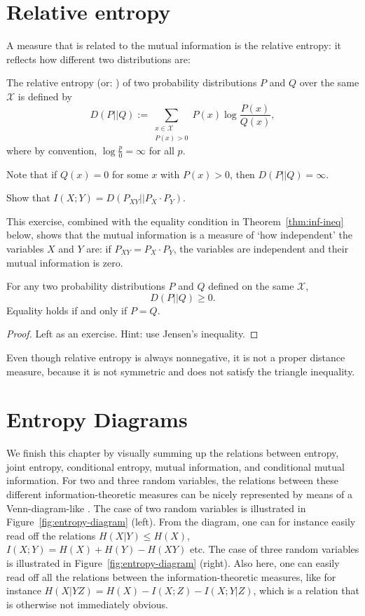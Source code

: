 \section{Relative entropy}
A measure that is related to the mutual information is the relative entropy: it reflects how different two distributions are:
\begin{definition}
The relative entropy (or: \href{https://en.wikipedia.org/wiki/Kullback%E2%80%93Leibler_divergence}{\term{Kullback-Leibler divergence}}) of two probability distributions $P$ and $Q$ over the same $\mathcal{X}$ is defined by
\[
D(P||Q) := \sum_{\substack{x \in \mathcal{X} \\ P(x) > 0}} P(x) \log \frac{P(x)}{Q(x)},
\]
where by convention, $\log\frac{p}{0} = \infty$ for all $p$.
\end{definition}
Note that if $Q(x) = 0$ for some $x$ with $P(x) > 0$, then $D(P||Q) = \infty$.

\begin{exercise}
Show that $I(X;Y) = D(P_{XY} || P_X \cdot P_Y)$. 
\end{exercise}
This exercise, combined with the equality condition in Theorem~\ref{thm:inf-ineq} below, shows that the mutual information is a measure of `how independent' the variables $X$ and $Y$ are: if $P_{XY} = P_X \cdot P_Y$, the variables are independent and their mutual information is zero.

\begin{theorem}\label{thm:inf-ineq}
For any two probability distributions $P$ and $Q$ defined on the same $\mathcal{X}$,
\[
D(P||Q) \geq 0.
\]
Equality holds if and only if $P = Q$.
\end{theorem}
\begin{proof}
Left as an exercise. Hint: use Jensen's inequality.
\end{proof}
Even though relative entropy is always nonnegative, it is not a proper
distance measure, because it is not symmetric and does not satisfy the
triangle inequality. 


\section{Entropy Diagrams}\label{sec:Venn}
We finish this chapter by visually summing up the relations between entropy, joint entropy, conditional entropy, mutual information, and conditional mutual information. For two and three random variables, the relations between these different information-theoretic measures can be nicely represented by means of a Venn-diagram-like . The case of two random variables is illustrated in Figure~\ref{fig:entropy-diagram} (left). From the diagram, one can for instance easily read off the relations $H(X|Y) \leq H(X)$, $I(X;Y) = H(X) + H(Y) - H(XY)$ etc. The case of three random variables is illustrated in Figure~\ref{fig:entropy-diagram} (right). Also here, one can easily read off all the relations between the information-theoretic measures, like for instance $H(X|YZ) = H(X) -I(X;Z) - I(X;Y|Z)$, which is a relation that is otherwise not immediately obvious.

